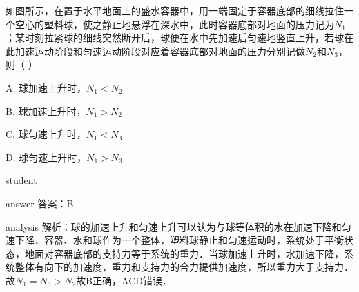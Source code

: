 \begin{example}
	如图所示，在置于水平地面上的盛水容器中，用一端固定于容器底部的细线拉住一个空心的塑料球，使之静止地悬浮在深水中，此时容器底部对地面的压力记为$ N_1 $；某时刻拉紧球的细线突然断开后，球便在水中先加速后匀速地竖直上升，若球在此加速运动阶段和匀速运动阶段对应着容器底部对地面的压力分别记做$ N_2 $和$ N_3 $，则（    ）
	
	A. 球加速上升时，$ N_1<N_2 $
	
	B. 球加速上升时，$ N_1>N_2 $
	
	C. 球匀速上升时，$ N_1<N_3 $
	
	D.  球匀速上升时，$ N_1>N_3 $
	
	
	
	\begin{taggedblock}{student}
		\vspace*{0cm}
	\end{taggedblock}
	
	
	\begin{taggedblock}{answer}
		答案：B
	\end{taggedblock}
	
	
	\begin{taggedblock}{analysis}
		解析：球的加速上升和匀速上升可以认为与球等体积的水在加速下降和匀速下降．容器、水和球作为一个整体，塑料球静止和匀速运动时，系统处于平衡状态，地面对容器底部的支持力等于系统的重力．当球加速上升时，水加速下降，系统整体有向下的加速度，重力和支持力的合力提供加速度，所以重力大于支持力．故$ N_1=N_3>N_2 $故B正确，ACD错误．
	\end{taggedblock}
\end{example}


